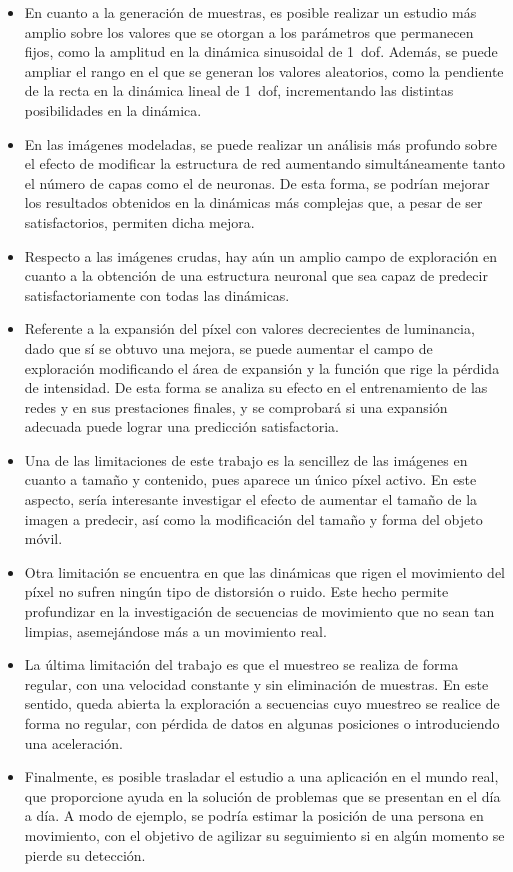 \begin{itemize}
    \item En cuanto a la generación de muestras, es posible realizar un estudio más amplio sobre los valores que se otorgan a los parámetros que permanecen fijos, como la amplitud en la dinámica sinusoidal de 1~\acrshort{dof}. Además, se puede ampliar el rango en el que se generan los valores aleatorios, como la pendiente de la recta en la dinámica lineal de 1~\acrshort{dof}, incrementando las distintas posibilidades en la dinámica.
	\item En las imágenes modeladas, se puede realizar un análisis más profundo sobre el efecto de modificar la estructura de red aumentando simultáneamente tanto el número de capas como el de neuronas. De esta forma, se podrían mejorar los resultados obtenidos en la dinámicas más complejas que, a pesar de ser satisfactorios, permiten dicha mejora.
	\item Respecto a las imágenes crudas, hay aún un amplio campo de exploración en cuanto a la obtención de una estructura neuronal que sea capaz de predecir satisfactoriamente con todas las dinámicas.
	\item Referente a la expansión del píxel con valores decrecientes de luminancia, dado que sí se obtuvo una mejora, se puede aumentar el campo de exploración modificando el área de expansión y la función que rige la pérdida de intensidad. De esta forma se analiza su efecto en el entrenamiento de las redes y en sus prestaciones finales, y se comprobará si una expansión adecuada puede lograr una predicción satisfactoria.
	\item Una de las limitaciones de este trabajo es la sencillez de las imágenes en cuanto a tamaño y contenido, pues aparece un único píxel activo. En este aspecto, sería interesante investigar el efecto de aumentar el tamaño de la imagen a predecir, así como la modificación del tamaño y forma del objeto móvil.
	\item Otra limitación se encuentra en que las dinámicas que rigen el movimiento del píxel no sufren ningún tipo de distorsión o ruido. Este hecho permite profundizar en la investigación de secuencias de movimiento que no sean tan limpias, asemejándose más a un movimiento real.
	\item La última limitación del trabajo es que el muestreo se realiza de forma regular, con una velocidad constante y sin eliminación de muestras. En este sentido, queda abierta la exploración a secuencias cuyo muestreo se realice de forma no regular, con pérdida de datos en algunas posiciones o introduciendo una aceleración.
	\item Finalmente, es posible trasladar el estudio a una aplicación en el mundo real, que proporcione ayuda en la solución de problemas que se presentan en el día a día. A modo de ejemplo, se podría estimar la posición de una persona en movimiento, con el objetivo de agilizar su seguimiento si en algún momento se pierde su detección.
\end{itemize}
